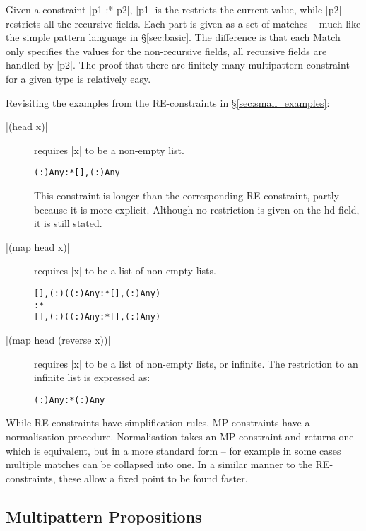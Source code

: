 \documentclass[preprint]{sigplanconf}
\newcommand{\C}[1]{\textsf{#1}}
\newenvironment{code}{\begin{alltt}\small}{\end{alltt}}
\begin{document}
Given a constraint |p1 :* p2|, |p1| is the restricts the current value, while |p2| restricts all the recursive fields. Each part is given as a set of matches -- much like the simple pattern language in \S\ref{sec:basic}. The difference is that each \C{Match} only specifies the values for the non-recursive fields, all recursive fields are handled by |p2|. The proof that there are finitely many multipattern constraint for a given type is relatively easy.

Revisiting the examples from the RE-constraints in \S\ref{sec:small_examples}:

\begin{description}
\item[|(head x)|] requires |x| to be a non-empty list.

    \begin{code}
    {(:) Any} :* {[], (:) Any}
    \end{code}
    
    This constraint is longer than the corresponding RE-constraint, partly because it is more explicit. Although no restriction is given on the \C{hd} field, it is still stated.

\item[|(map head x)|] requires |x| to be a list of non-empty lists.

    \begin{code}
    {[], (:) ({(:) Any} :* {[], (:) Any})}
    :*
    {[], (:) ({(:) Any} :* {[], (:) Any})}
    \end{code}

\item[|(map head (reverse x))|] requires |x| to be a list of non-empty lists, or infinite. The restriction to an infinite list is expressed as:

    \begin{code}
    {(:) Any} :* {(:) Any}
    \end{code}
\end{description}

While RE-constraints have simplification rules, MP-constraints have a normalisation procedure. Normalisation takes an MP-constraint and returns one which is equivalent, but in a more standard form -- for example in some cases multiple matches can be collapsed into one. In a similar manner to the RE-constraints, these allow a fixed point to be found faster.

\subsection{Multipattern Propositions}
\end{document}
